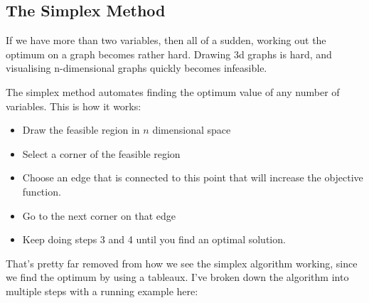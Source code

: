 \subsection{The Simplex Method}

If we have more than two variables, then all of a sudden, working out the
optimum on a graph becomes rather hard. Drawing 3d graphs is hard, and
visualising n-dimensional graphs quickly becomes infeasible.

The simplex method automates finding the optimum value of any number of
variables. This is how it works:

\begin{itemize}
  \item Draw the feasible region in $n$ dimensional space
  \item Select a corner of the feasible region
  \item Choose an edge that is connected to this point that will increase the
  objective function.
  \item Go to the next corner on that edge
  \item Keep doing steps 3 and 4 until you find an optimal solution.
\end{itemize}

That's pretty far removed from how we see the simplex algorithm working, since
we find the optimum by using a tableaux. I've broken down the algorithm into
multiple steps with a running example here:

